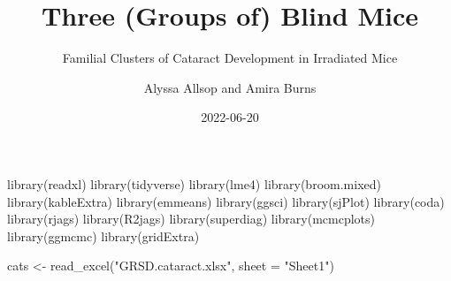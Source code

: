 \documentclass[
]{article}
\title{Three (Groups of) Blind Mice}
\subtitle{Familial Clusters of Cataract Development in Irradiated Mice}
\author{Alyssa Allsop and Amira Burns}
\date{2022-06-20}
\newenvironment{Shaded}{\begin{snugshade}}{\end{snugshade}}
\newcommand{\AttributeTok}[1]{\textcolor[rgb]{0.77,0.63,0.00}{#1}}
\newcommand{\FunctionTok}[1]{\textcolor[rgb]{0.00,0.00,0.00}{#1}}
\newcommand{\NormalTok}[1]{#1}
\newcommand{\OtherTok}[1]{\textcolor[rgb]{0.56,0.35,0.01}{#1}}
\newcommand{\StringTok}[1]{\textcolor[rgb]{0.31,0.60,0.02}{#1}}
\begin{document}
\maketitle

\begin{Shaded}
\begin{Highlighting}[]
\FunctionTok{library}\NormalTok{(readxl)}
\FunctionTok{library}\NormalTok{(tidyverse)}
\FunctionTok{library}\NormalTok{(lme4)}
\FunctionTok{library}\NormalTok{(broom.mixed)}
\FunctionTok{library}\NormalTok{(kableExtra)}
\FunctionTok{library}\NormalTok{(emmeans)}
\FunctionTok{library}\NormalTok{(ggsci)}
\FunctionTok{library}\NormalTok{(sjPlot)}
\FunctionTok{library}\NormalTok{(coda)}
\FunctionTok{library}\NormalTok{(rjags)}
\FunctionTok{library}\NormalTok{(R2jags)}
\FunctionTok{library}\NormalTok{(superdiag)}
\FunctionTok{library}\NormalTok{(mcmcplots)}
\FunctionTok{library}\NormalTok{(ggmcmc)}
\FunctionTok{library}\NormalTok{(gridExtra)}
\end{Highlighting}
\end{Shaded}

\begin{Shaded}
\begin{Highlighting}[]
\NormalTok{cats }\OtherTok{\textless{}{-}} \FunctionTok{read\_excel}\NormalTok{(}\StringTok{"GRSD.cataract.xlsx"}\NormalTok{, }\AttributeTok{sheet =} \StringTok{"Sheet1"}\NormalTok{)}
\end{Highlighting}
\end{Shaded}
\end{document}
